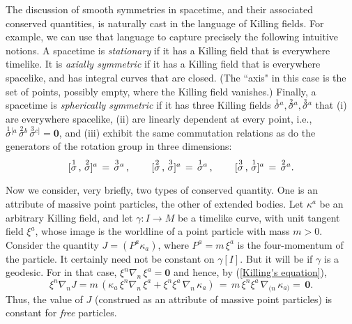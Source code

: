 \documentclass [12] {article}
\theoremstyle{plain}
\numberwithin{figure}{subsection}
\numberwithin{proposition}{subsection}
\begin{document}
The discussion of smooth symmetries in spacetime, and their associated conserved quantities,
is naturally cast in the language of Killing fields. For example, we can use that language to capture precisely the following intuitive notions.  A spacetime is \emph{stationary} if it has a Killing field that  is everywhere timelike. 
 It is \emph{axially symmetric} if it has a Killing field that is everywhere spacelike, and has integral curves that are closed.  (The ``axis" in this case is the set of points, possibly empty,  where the Killing field vanishes.) Finally, a spacetime is \emph{spherically symmetric} if it has three Killing fields $\overset{1}{\sigma}{}^a, \overset{2}{\sigma}{}^a, \overset{3}{\sigma}{}^a$ that (i) are everywhere spacelike, (ii) are linearly dependent at every point, i.e., 
$\overset{1}{\sigma}{}^{[a} \,  \overset{2}{\sigma}{}^b \, \overset{3}{\sigma}{}^{c]} = \textbf{0}$, and (iii) exhibit the same commutation relations as do the generators of the rotation group in three dimensions:  
\begin{equation} \label{Lie commutation relations}
[\overset{1}{\sigma}  \, , \,   \overset{2}{\sigma}]^ a \, = \, \overset{3}{\sigma}{}^a \, , \hspace{.3in}
[\overset{2}{\sigma}  \, , \,   \overset{3}{\sigma}]^ a \, = \, \overset{1}{\sigma}{}^a \, , \hspace{.3in}
[\overset{3}{\sigma}  \, , \,   \overset{1}{\sigma}]^ a \, = \, \overset{2}{\sigma}{}^a.
\end{equation}
 
Now we consider, very briefly, two types of conserved quantity. One is an attribute of massive point particles, the other of extended bodies.   Let $\kappa^a$ be an arbitrary Killing field, and let $\gamma: I \rightarrow M$ be a  timelike curve, with unit tangent field $\xi^a$, whose image is the worldline of a point particle with mass $m > 0$.  Consider the quantity  $J = (P^a  \kappa_a)$, where $P^a = m \,  \xi^a$ is the four-momentum of the particle.  It certainly need not be constant on $\gamma [I]$.  But it will be if  $\gamma$ is a geodesic. For in that case,  $\xi^n \nabla_n \, \xi^a = \textbf{0}$ and hence, by (\ref{Killing's equation}),  
\begin{equation} \label{1st Killing constancy equation}
\xi^n \nabla_n J =  m \,  (\kappa_a \, \xi^n \nabla_n \, \xi^a  +   \xi^n  \xi^a \, \nabla_n \, \kappa_a) \, = \,
m \,  \xi^n  \xi^a \, \nabla_{(n} \, \kappa_{a)} =  \,  \textbf{0}.   
\end{equation}
%
\noindent Thus, the value of $J$ (construed as an attribute of massive point particles) is constant for \emph{free} particles.       
\end{document}
